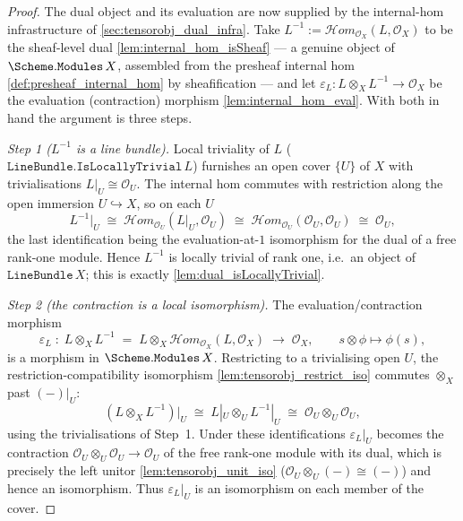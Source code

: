\begin{proof}
  \leanok
  The dual object and its evaluation are now supplied by the internal-hom
  infrastructure of \cref{sec:tensorobj_dual_infra}. Take
  \(L^{-1} := \mathcal{H}om_{\mathcal{O}_X}(L, \mathcal{O}_X)\) to be the
  sheaf-level dual \cref{lem:internal_hom_isSheaf} --- a genuine object of
  \(\Scheme.\mathtt{Modules}\,X\), assembled from the presheaf internal hom
  \cref{def:presheaf_internal_hom} by sheafification --- and let
  \(\varepsilon_L : L \otimes_X L^{-1} \to \mathcal{O}_X\) be the evaluation
  (contraction) morphism \cref{lem:internal_hom_eval}. With both in hand the
  argument is three steps.

  \emph{Step 1 (\(L^{-1}\) is a line bundle).} Local triviality of \(L\)
  (\(\mathtt{LineBundle.IsLocallyTrivial}\,L\)) furnishes an open cover \(\{U\}\) of
  \(X\) with trivialisations \(L|_U \cong \mathcal{O}_U\). The internal hom commutes
  with restriction along the open immersion \(U \hookrightarrow X\), so on each \(U\)
  \[
    L^{-1}\big|_U \;\cong\; \mathcal{H}om_{\mathcal{O}_U}(L|_U, \mathcal{O}_U)
                 \;\cong\; \mathcal{H}om_{\mathcal{O}_U}(\mathcal{O}_U, \mathcal{O}_U)
                 \;\cong\; \mathcal{O}_U ,
  \]
  the last identification being the evaluation-at-\(1\) isomorphism for the dual of a
  free rank-one module. Hence \(L^{-1}\) is locally trivial of rank one, i.e.\ an
  object of \(\texttt{LineBundle}\,X\); this is exactly
  \cref{lem:dual_isLocallyTrivial}.

  \emph{Step 2 (the contraction is a local isomorphism).} The evaluation/contraction
  morphism
  \[
    \varepsilon_L \;\colon\; L \otimes_X L^{-1}
      \;=\; L \otimes_X \mathcal{H}om_{\mathcal{O}_X}(L, \mathcal{O}_X)
      \;\longrightarrow\; \mathcal{O}_X,
    \qquad s \otimes \phi \longmapsto \phi(s),
  \]
  is a morphism in \(\Scheme.\mathtt{Modules}\,X\). Restricting to a trivialising
  open \(U\), the restriction-compatibility isomorphism \cref{lem:tensorobj_restrict_iso}
  commutes \(\otimes_X\) past \((-)|_U\):
  \[
    (L \otimes_X L^{-1})\big|_U \;\cong\; L|_U \otimes_U L^{-1}|_U
      \;\cong\; \mathcal{O}_U \otimes_U \mathcal{O}_U ,
  \]
  using the trivialisations of Step~1. Under these identifications \(\varepsilon_L|_U\)
  becomes the contraction \(\mathcal{O}_U \otimes_U \mathcal{O}_U \to \mathcal{O}_U\) of
  the free rank-one module with its dual, which is precisely the left unitor
  \cref{lem:tensorobj_unit_iso} (\(\mathcal{O}_U \otimes_U (-) \cong (-)\)) and hence an
  isomorphism. Thus \(\varepsilon_L|_U\) is an isomorphism on each member of the cover.


\end{proof}
